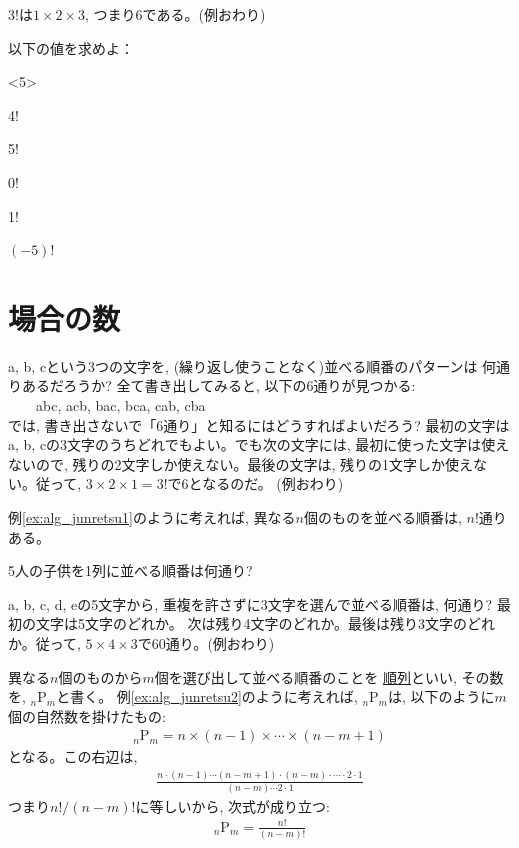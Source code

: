 \begin{exmpl} 3!は$1 \times 2 \times 3$, つまり6である。(例おわり)\end{exmpl}

\begin{q}\label{q:alg_prod0} 
以下の値を求めよ：
\begin{edaenumerate}<5>
\item 4!
\item 5!
\item 0!
\item 1!
\item $(-5)!$
\end{edaenumerate}
\end{q}
\mv


\section{場合の数}

\begin{exmpl}\label{ex:alg_junretsu1} a, b, cという3つの文字を, 
(繰り返し使うことなく)並べる順番のパターンは
何通りあるだろうか? 全て書き出してみると, 以下の6通りが見つかる:\\
　　abc, acb, bac, bca, cab, cba\\
では, 書き出さないで「6通り」と知るにはどうすればよいだろう? 
最初の文字はa, b, cの3文字のうちどれでもよい。でも次の文字には, 
最初に使った文字は使えないので, 残りの2文字しか使えない。最後の文字は, 
残りの1文字しか使えない。従って, $3 \times 2 \times 1=3!$で6となるのだ。
(例おわり)\end{exmpl}
\mv

例\ref{ex:alg_junretsu1}のように考えれば, 異なる$n$個のものを並べる順番は, $n!$通りある。

\begin{q}\label{q:alg_comb5}
 5人の子供を1列に並べる順番は何通り? 
\end{q}

\begin{exmpl}\label{ex:alg_junretsu2} a, b, c, d, eの5文字から, 
重複を許さずに3文字を選んで並べる順番は, 何通り? 最初の文字は5文字のどれか。
次は残り4文字のどれか。最後は残り3文字のどれか。従って, $5 \times 4 \times 3$で60通り。(例おわり)
\end{exmpl}
\mv

異なる$n$個のものから$m$個を選び出して並べる順番のことを
\underline{順列}といい, その数を, $_n$P$_m$と書く。
例\ref{ex:alg_junretsu2}のように考えれば, $_n$P$_m$は, 
以下のように$m$個の自然数を掛けたもの:
\begin{eqnarray}
_n\text{P}_m=n \times (n-1) \times \cdots \times (n-m+1)
\end{eqnarray}
となる。この右辺は, 
\begin{eqnarray*}
\frac{n \cdot (n-1)\cdots(n-m+1)\cdot(n-m)\cdot\cdots\cdot2\cdot1}{(n-m)\cdots2\cdot1}
\end{eqnarray*}
つまり$n!/(n-m)!$に等しいから, 次式が成り立つ:
\begin{eqnarray}
_n\text{P}_m = \frac{n!}{(n-m)!} \label{eq:junretsu}
\end{eqnarray}


